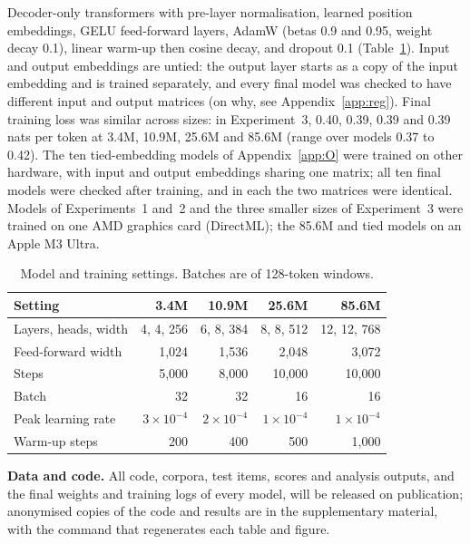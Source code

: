 \FloatBarrier
{}\label{app:train}
\setcounter{table}{0}\renewcommand{\thetable}{\thesection\arabic{table}}
Decoder-only transformers with pre-layer normalisation, learned position embeddings, GELU feed-forward layers, AdamW (betas 0.9 and 0.95, weight decay 0.1), linear warm-up then cosine decay, and dropout 0.1 (Table~\ref{tab:train}). Input and output embeddings are untied: the output layer starts as a copy of the input embedding and is trained separately, and every final model was checked to have different input and output matrices (on why, see Appendix~\ref{app:reg}). Final training loss was similar across sizes: in Experiment~3, 0.40, 0.39, 0.39 and 0.39 nats per token at 3.4M, 10.9M, 25.6M and 85.6M (range over models 0.37 to 0.42). The ten tied-embedding models of Appendix~\ref{app:O} were trained on other hardware, with input and output embeddings sharing one matrix; all ten final models were checked after training, and in each the two matrices were identical. Models of Experiments~1 and~2 and the three smaller sizes of Experiment~3 were trained on one AMD graphics card (DirectML); the 85.6M and tied models on an Apple M3 Ultra.

\begin{table}[!htbp]
\centering\small

\begin{tabular}{@{}lrrrr@{}}
\toprule
Setting & 3.4M & 10.9M & 25.6M & 85.6M \\
\midrule
Layers, heads, width & 4, 4, 256 & 6, 8, 384 & 8, 8, 512 & 12, 12, 768 \\
Feed-forward width & 1,024 & 1,536 & 2,048 & 3,072 \\
Steps & 5,000 & 8,000 & 10,000 & 10,000 \\
Batch & 32 & 32 & 16 & 16 \\
Peak learning rate & $3\times10^{-4}$ & $2\times10^{-4}$ & $1\times10^{-4}$ & $1\times10^{-4}$ \\
Warm-up steps & 200 & 400 & 500 & 1,000 \\
\bottomrule
\end{tabular}
\caption{Model and training settings. Batches are of 128-token windows.}
\label{tab:train}
\end{table}

\textbf{Data and code.} All code, corpora, test items, scores and analysis outputs, and the final weights and training logs of every model, will be released on publication; anonymised copies of the code and results are in the supplementary material, with the command that regenerates each table and figure.

